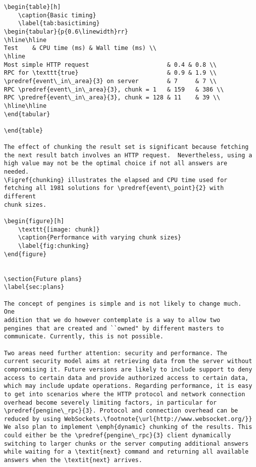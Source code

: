 \documentclass{new_tlp}
\newcommand{\reffont}{\tt}
\newcommand{\predref}[2]{\mbox{\reffont #1/#2}}
\newcommand{\Figref}[1]{Figure~\ref{fig:#1}}
\begin{document}
\begin{verbatim}
\begin{table}[h]
    \caption{Basic timing}
    \label{tab:basictiming}
\begin{tabular}{p{0.6\linewidth}rr}
\hline\hline
Test	& CPU time (ms) & Wall time (ms) \\
\hline
Most simple HTTP request                      & 0.4 & 0.8 \\
RPC for \texttt{true}                         & 0.9 & 1.9 \\
\predref{event\_in\_area}{3} on server        & 7     &	7 \\
RPC \predref{event\_in\_area}{3}, chunk = 1   & 159   & 386 \\
RPC \predref{event\_in\_area}{3}, chunk = 128 & 11    & 39 \\
\hline\hline
\end{tabular}

\end{table}

The effect of chunking the result set is significant because fetching
the next result batch involves an HTTP request.  Nevertheless, using a
high value may not be the optimal choice if not all answers are needed.
\Figref{chunking} illustrates the elapsed and CPU time used for
fetching all 1981 solutions for \predref{event\_point}{2} with different
chunk sizes.

\begin{figure}[h]
	\texttt{[image: chunk]}
    \caption{Performance with varying chunk sizes}
    \label{fig:chunking}
\end{figure}


\section{Future plans}
\label{sec:plans}

The concept of pengines is simple and is not likely to change much. One
addition that we do however contemplate is a way to allow two
pengines that are created and ``owned" by different masters to
communicate. Currently, this is not possible.

Two areas need further attention: security and performance. The
current security model aims at retrieving data from the server without
compromising it. Future versions are likely to include support to deny
access to certain data and provide authorized access to certain data,
which may include update operations. Regarding performance, it is easy
to get into scenarios where the HTTP protocol and network connection
overhead become severely limiting factors, in particular for
\predref{pengine\_rpc}{3}. Protocol and connection overhead can be
reduced by using WebSockets.\footnote{\url{http://www.websocket.org/}}
We also plan to implement \emph{dynamic} chunking of the results. This
could either be the \predref{pengine\_rpc}{3} client dynamically
switching to larger chunks or the server computing additional answers
while waiting for a \textit{next} command and returning all available
answers when the \textit{next} arrives.



\end{verbatim}
\end{document}
